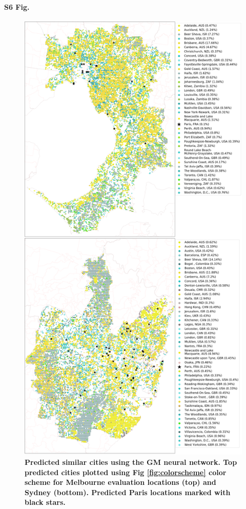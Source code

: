 \documentclass[10pt,letterpaper]{article}
\begin{document}
\paragraph*{S6 Fig.}
\begin{figure}[!htbp]
\centering   
\includegraphics[scale=0.33]{Images/PlosOne/Fig6.png}  
\caption{\bf Predicted similar cities using the GM neural network. Top predicted cities plotted using Fig \ref{fig:colorscheme} color scheme for Melbourne evaluation locations (top) and Sydney (bottom). Predicted Paris locations marked with black stars.}    
 \label{fig:melmaps}  
\end{figure} 
\end{document}
